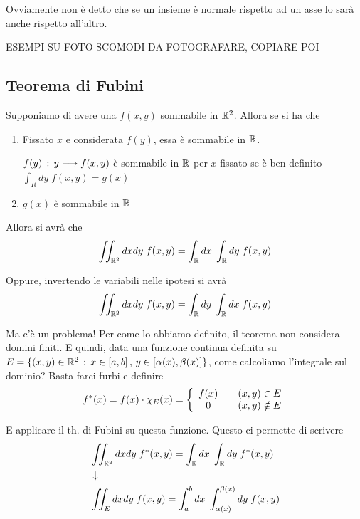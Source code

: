 Ovviamente non è detto che se un insieme è normale rispetto ad un asse lo sarà anche rispetto all'altro.

\newpage

ESEMPI SU FOTO SCOMODI DA FOTOGRAFARE, COPIARE POI

\newpage


\subsection{Teorema di Fubini}

Supponiamo di avere una $f(x,y)$ sommabile in $\mathbb{R}^2$. Allora se si ha che
\begin{enumerate}
	\item Fissato $x$ e considerata $f(y)$, essa è sommabile in $\mathbb{R}$.
	
	$f(y) \, : \, y \longrightarrow f(x,y)$ è sommabile in $\mathbb{R}$ per $x$ fissato \qo se è ben definito $\int_{R} dy \; f(x,y) = g(x)$  
	
	\item $g(x)$ è sommabile in $\mathbb{R}$ 
\end{enumerate}

Allora si avrà che
\begin{align}
	\iint_{\mathbb{R}^2}dxdy \; f(x,y) = \int_{\mathbb{R}} dx \; \int_{\mathbb{R}} dy \; f(x,y)
\end{align}

Oppure, invertendo le variabili nelle ipotesi si avrà
\begin{align}
	\iint_{\mathbb{R}^2}dxdy \; f(x,y) = \int_{\mathbb{R}} dy \; \int_{\mathbb{R}} dx \; f(x,y)
\end{align}

\bigskip

Ma c'è un problema! Per come lo abbiamo definito, il teorema non considera domini finiti. E quindi, data una funzione continua definita su $E = \{ (x,y)\in \mathbb{R}^2 \, : \, x\in[a,b] \, , \, y \in [\alpha(x), \beta(x)] \}$, come calcoliamo l'integrale sul dominio? Basta farci furbi e definire
\begin{align}
	f^*(x) = f(x) \cdot \chi_E(x) = \left\{\begin{array}{cc} f(x) \quad {}& (x,y)\in E  \\ 0 \quad & (x,y) \notin E \end{array}\right.
\end{align}

E applicare il th. di Fubini su questa funzione.  Questo ci permette di scrivere
\begin{align}
	{}&\iint_{\mathbb{R}^2}dxdy \; f^*(x,y) = \int_{\mathbb{R}} dx \; \int_{\mathbb{R}} dy \; f^*(x,y)\nonumber \\ &\downarrow \nonumber \\
	&\iint_{E}dxdy \; f(x,y) = \int_{a}^{b} dx \; \int_{\alpha(x)}^{\beta(x)} dy \; f(x,y)
\end{align}


